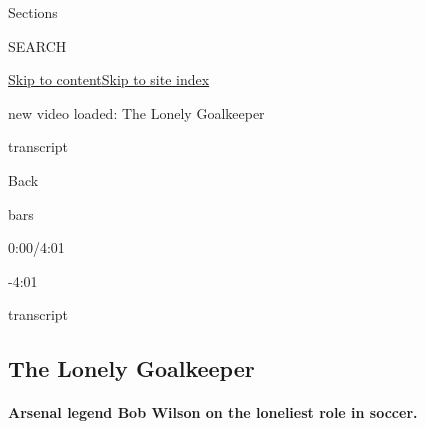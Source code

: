 Sections

SEARCH

\protect\hyperlink{site-content}{Skip to
content}\protect\hyperlink{site-index}{Skip to site index}

new video loaded: The Lonely Goalkeeper

transcript

Back

bars

0:00/4:01

-4:01

transcript

\hypertarget{the-lonely-goalkeeper}{%
\subsection{The Lonely Goalkeeper}\label{the-lonely-goalkeeper}}

\hypertarget{arsenal-legend-bob-wilson-on-the-loneliest-role-in-soccer}{%
\paragraph{Arsenal legend Bob Wilson on the loneliest role in
soccer.}\label{arsenal-legend-bob-wilson-on-the-loneliest-role-in-soccer}}

